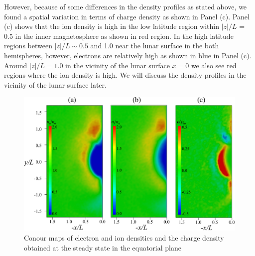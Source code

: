 \documentclass[draft,jgrga]{agutex2015}
\begin{document}
\begin{article}
However, because of some differences in the density profiles as stated above, 
we found a spatial variation in terms of charge density as shown in Panel (c). 
Panel (c) shows that the ion density is high in the low latitude region 
within $|z|/L$ = 0.5 in the inner magnetosphere as shown in red region. 
In the high latitude regions between $|z|/L \sim 0.5$ and 1.0 
near the lunar surface in the both hemispheres, 
however, electrons are relatively high as shown in blue in Panel (c).
Around $|z|/L=1.0$ in the vicinity of the lunar surface $x=0$
we also see red regions where the ion density is high.
We will discuss the density profiles in the vicinity of the lunar surface later.


\begin{figure}[t]
\centering
\noindent\includegraphics[width=15cm]{./figures/Fig_3_bb-crop.pdf}
\caption{Conour maps of electron and ion densities and the charge density 
obtained at the steady state in the equatorial plane}\label{fig:3}
\end{figure}


\end{article}
\end{document}
